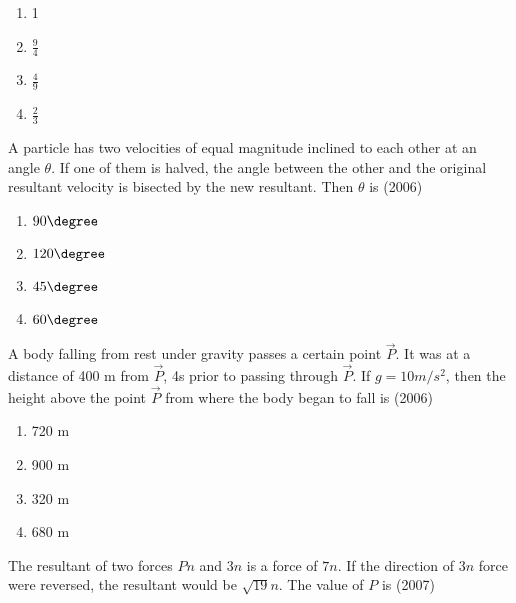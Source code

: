         \begin{multicols}{4} 
            \begin{enumerate}
                \item 1
                \item $\frac {9} {4}$
                \item $\frac {4} {9}$
                \item $\frac {2} {3}$
            \end{enumerate}
        \end{multicols}

    \item A particle has two velocities of equal magnitude inclined to
        each other at an angle $\theta$. If one of them is halved, the
        angle between the other and the original resultant velocity is
        bisected by the new resultant. Then $\theta$ is
        \hfill (2006)

        \begin{multicols}{4}
            \begin{enumerate}
                \item $90 \degree$
                \item $120 \degree$
                \item $45 \degree$
                \item $60 \degree$
            \end{enumerate}
        \end{multicols}

    \item A body falling from rest under gravity passes a certain
        point $\vec P$. It was at a distance of 400 m from $\vec P$,
        4s prior to passing through $\vec P$. If $g = 10 m/s^2$, then the
        height above the point $\vec P$ from where the body began to
        fall is
        \hfill (2006)

        \begin{multicols}{4}
            \begin{enumerate}
                \item 720 m
                \item 900 m 
                \item 320 m 
                \item 680 m 
            \end{enumerate} 
        \end{multicols}

    \item The resultant of two forces $Pn$ and $3n$ is a force of
        $7n$. If the direction of $3n$ force were reversed, the
        resultant would be $\sqrt{19}n$. The value of $P$ is
        \hfill (2007)

